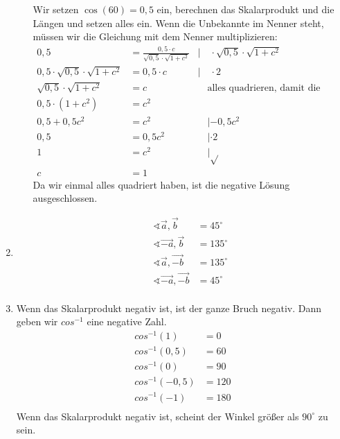 \begin{enumerate}
\begin{enumerate}
                        Wir setzen $\cos(60)=0,5$ ein, berechnen das
                        Skalarprodukt und die Längen und setzen alles ein.
                        Wenn die Unbekannte im Nenner steht,
                        müssen wir die Gleichung mit dem Nenner
                        multiplizieren:
                        \begin{align*}
                          0,5 &=\frac {0,5\cdot c}
                                {\sqrt{0,5}\cdot\sqrt{1+c^2}}&|\quad
                                                                 \cdot
                                                                 \sqrt{0,5}\cdot\sqrt{1+c^2}&\\
                          0,5\cdot \sqrt{0,5}\cdot\sqrt{1+c^2}
                              &=0,5\cdot c &|\quad \cdot 2&\\
                          \sqrt{0,5}\cdot\sqrt{1+c^2}&=c &\quad \textrm{alles
                                                           quadrieren, damit
                                                           die Wurzel
                                                           wegkommt}&\\
                          0,5\cdot (1+c^2) &= c^2& &\\
                          0,5 +0,5c^2 &= c^2 &\quad | -0,5c^2 &\\
                          0,5 &= 0,5c^2 & \quad | \cdot 2 &\\
                          1&= c^2 &\quad |\sqrt{ } &\\
                          c&=1
                        \end{align*}
                        Da wir einmal alles quadriert haben, ist die
                        negative Lösung ausgeschlossen.

                        
		\end{enumerate}			
		
		\item
		\begin{align*}
			&&\sphericalangle \vec{a}, \vec{b}   &=45^\circ\\
			&&\sphericalangle \vec{-a}, \vec{b}  &=135^\circ\\
			&&\sphericalangle \vec{a} , \vec{-b} &=135^\circ\\
			&&\sphericalangle \vec{-a}, \vec{-b} &=45^\circ\\
		\end{align*}
		
		\item
		Wenn das Skalarprodukt negativ ist, ist der ganze Bruch negativ. Dann geben wir $cos^{-1}$ eine negative Zahl. 
		\begin{align*}
		cos^{-1}(1)		&= 0\\
		cos^{-1}(0,5)	&= 60\\
		cos^{-1}(0)		&= 90\\
		cos^{-1}(-0,5)	&= 120\\
		cos^{-1}(-1)	&= 180\\
		\end{align*}
		Wenn das Skalarprodukt negativ ist, scheint der Winkel größer als $90^\circ$ zu sein.
		

\end{enumerate}
